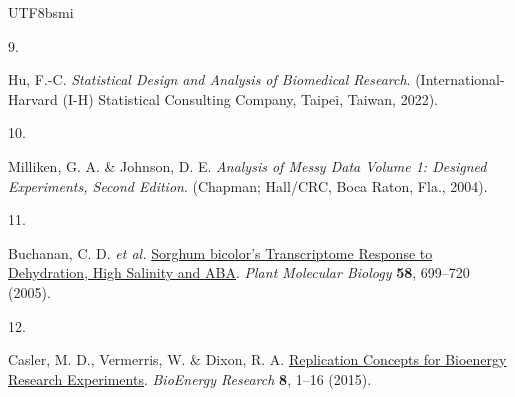 \documentclass[
]{book}
\newlength{\cslhangindent}
\newlength{\csllabelwidth}
\newlength{\cslentryspacingunit} %
\newenvironment{CSLReferences}[2] %
 {%
  \setlength{\parindent}{0pt}
  \ifodd #1
  \let\oldpar\par
  \def\par{\hangindent=\cslhangindent\oldpar}
  \fi
  \setlength{\parskip}{#2\cslentryspacingunit}
 }%
 {}
\newcommand{\CSLLeftMargin}[1]{\parbox[t]{\csllabelwidth}{#1}}
\newcommand{\CSLRightInline}[1]{\parbox[t]{\linewidth - \csllabelwidth}{#1}\break}
\theoremstyle{definition}
\theoremstyle{definition}
\theoremstyle{definition}
\theoremstyle{definition}
\theoremstyle{remark}
\begin{document}
\begin{CJK}{UTF8}{bsmi}
\begin{CSLReferences}{0}{0}
\leavevmode{}%
\CSLLeftMargin{9. }%
\CSLRightInline{Hu, F.-C. \emph{Statistical Design and Analysis of Biomedical Research}. (International-Harvard (I-H) Statistical Consulting Company, Taipei, Taiwan, 2022).}

\leavevmode{}%
\CSLLeftMargin{10. }%
\CSLRightInline{Milliken, G. A. \& Johnson, D. E. \emph{Analysis of Messy Data Volume 1: Designed Experiments, Second Edition}. (Chapman; Hall/CRC, Boca Raton, Fla., 2004).}

\leavevmode{}%
\CSLLeftMargin{11. }%
\CSLRightInline{Buchanan, C. D. \emph{et al.} \href{https://doi.org/10.1007/s11103-005-7876-2}{Sorghum bicolor{'}s Transcriptome Response to Dehydration, High Salinity and ABA}. \emph{Plant Molecular Biology} \textbf{58}, 699--720 (2005).}

\leavevmode{}%
\CSLLeftMargin{12. }%
\CSLRightInline{Casler, M. D., Vermerris, W. \& Dixon, R. A. \href{https://doi.org/10.1007/s12155-015-9580-7}{Replication Concepts for Bioenergy Research Experiments}. \emph{BioEnergy Research} \textbf{8}, 1--16 (2015).}

\end{CSLReferences}
\end{CJK}
\end{document}
